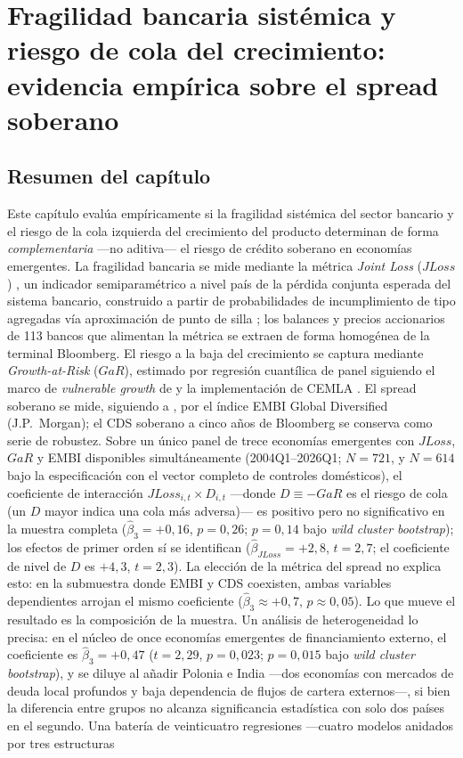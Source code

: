 \chapter{Fragilidad bancaria sistémica y riesgo de cola del crecimiento: evidencia empírica sobre el spread soberano}
\label{chap:paper2}

\section*{Resumen del capítulo}

Este capítulo evalúa empíricamente si la fragilidad sistémica del sector bancario y el riesgo de la cola izquierda del crecimiento del producto determinan de forma \emph{complementaria} —no aditiva— el riesgo de crédito soberano en economías emergentes. La fragilidad bancaria se mide mediante la métrica \textit{Joint Loss} ($JLoss$) \citep{Chari2024b}, un indicador semiparamétrico a nivel país de la pérdida conjunta esperada del sistema bancario, construido a partir de probabilidades de incumplimiento de tipo \citet{Merton1974b} agregadas vía aproximación de punto de silla \citep{MartinThompsonBrowne2001}; los balances y precios accionarios de 113 bancos que alimentan la métrica se extraen de forma homogénea de la terminal Bloomberg. El riesgo a la baja del crecimiento se captura mediante \textit{Growth-at-Risk} ($GaR$), estimado por regresión cuantílica de panel \citep{Koenker2004} siguiendo el marco de \textit{vulnerable growth} de \citet{ABG2019b} y la implementación de CEMLA \citep{OssandonBusch2022}. El spread soberano se mide, siguiendo a \citet{Chari2024b}, por el índice EMBI Global Diversified (J.P.\ Morgan); el CDS soberano a cinco años de Bloomberg se conserva como serie de robustez. Sobre un único panel de trece economías emergentes con $JLoss$, $GaR$ y EMBI disponibles simultáneamente (2004Q1--2026Q1; $N=721$, y $N=614$ bajo la especificación con el vector completo de controles domésticos), el coeficiente de interacción $JLoss_{i,t}\times D_{i,t}$ —donde $D\equiv-GaR$ es el riesgo de cola (un $D$ mayor indica una cola más adversa)— es positivo pero no significativo en la muestra completa ($\hat\beta_3=+0{,}16$, $p=0{,}26$; $p=0{,}14$ bajo \textit{wild cluster bootstrap}); los efectos de primer orden sí se identifican ($\hat\beta_{JLoss}=+2{,}8$, $t=2{,}7$; el coeficiente de nivel de $D$ es $+4{,}3$, $t=2{,}3$). La elección de la métrica del spread no explica esto: en la submuestra donde EMBI y CDS coexisten, ambas variables dependientes arrojan el mismo coeficiente ($\hat\beta_3\approx+0{,}7$, $p\approx0{,}05$). Lo que mueve el resultado es la composición de la muestra. Un análisis de heterogeneidad lo precisa: en el núcleo de once economías emergentes de financiamiento externo, el coeficiente es $\hat\beta_3=+0{,}47$ ($t=2{,}29$, $p=0{,}023$; $p=0{,}015$ bajo \textit{wild cluster bootstrap}), y se diluye al añadir Polonia e India —dos economías con mercados de deuda local profundos y baja dependencia de flujos de cartera externos—, si bien la diferencia entre grupos no alcanza significancia estadística con solo dos países en el segundo. Una batería de veinticuatro regresiones —cuatro modelos anidados por tres estructuras 